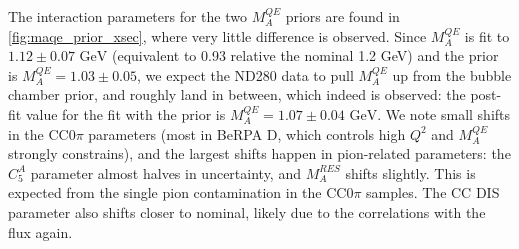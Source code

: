 The interaction parameters for the two $M_A^{QE}$ priors are found in \autoref{fig:maqe_prior_xsec}, where very little difference is observed. Since $M_A^{QE}$ is fit to $1.12\pm0.07\text{ GeV}$ (equivalent to 0.93 relative the nominal 1.2 GeV) and the prior is $M_A^{QE}=1.03\pm0.05$, we expect the ND280 data to pull $M_A^{QE}$ up from the bubble chamber prior, and roughly land in between, which indeed is observed: the post-fit value for the fit with the prior is $M_A^{QE}=1.07\pm0.04\text{ GeV}$. We note small shifts in the CC0$\pi$ parameters (most in BeRPA D, which controls high $Q^2$ and $M_A^{QE}$ strongly constrains), and the largest shifts happen in pion-related parameters: the $C_5^A$ parameter almost halves in uncertainty, and $M_A^{RES}$ shifts slightly. This is expected from the single pion contamination in the CC0$\pi$ samples. The CC DIS parameter also shifts closer to nominal, likely due to the correlations with the flux again.
